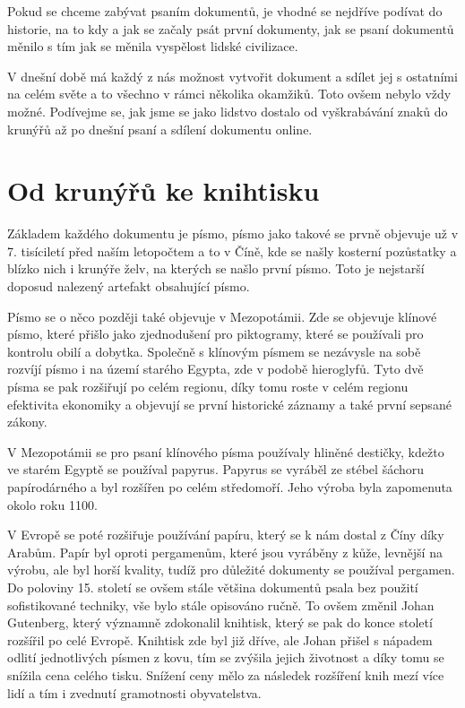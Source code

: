 Pokud se chceme zabývat psaním dokumentů, je vhodné se nejdříve podívat do historie, na to kdy a jak se začaly psát první dokumenty, jak se psaní dokumentů
měnilo s tím jak se měnila vyspělost lidské civilizace.

V dnešní době má každý z nás možnost vytvořit dokument a sdílet jej s ostatními na celém světe a to všechno v rámci několika okamžiků. Toto ovšem nebylo
vždy možné. Podívejme se, jak jsme se jako lidstvo dostalo od vyškrabávání znaků do krunýřů až po dnešní psaní a sdílení dokumentu online.

\section{Od krunýřů ke knihtisku}

Základem každého dokumentu je písmo, písmo jako takové se prvně objevuje už v 7. tisíciletí před naším letopočtem a to v Číně,
kde se našly kosterní pozůstatky a blízko nich i krunýře želv, na kterých se našlo první písmo. \cite{EarliestWriting} Toto je nejstarší doposud
nalezený artefakt obsahující písmo.

Písmo se o něco později také objevuje v Mezopotámii. Zde se objevuje klínové písmo, které přišlo jako zjednodušení pro piktogramy, které se používali
pro kontrolu obilí a dobytka. Společně s klínovým písmem se nezávysle na sobě rozvíjí písmo i na území starého Egypta, zde v podobě hieroglyfů. Tyto dvě
písma se pak rozšiřují po celém regionu, díky tomu roste v celém regionu efektivita ekonomiky a objevují se první historické záznamy
\cite{MesopotamiaHistory} a také první sepsané zákony.

V Mezopotámii se pro psaní klínového písma používaly hliněné destičky, kdežto ve starém Egyptě se používal papyrus. Papyrus se vyráběl ze stébel šáchoru
papírodárného a byl rozšířen po celém středomoří. Jeho výroba byla zapomenuta okolo roku 1100.

V Evropě se poté rozšiřuje používání papíru, který se k nám dostal z Číny díky Arabům. Papír byl oproti pergamenům, které jsou vyráběny z kůže, levnější
na výrobu, ale byl horší kvality, tudíž pro důležité dokumenty se používal pergamen. Do poloviny 15. století se ovšem stále většina dokumentů psala bez
použití sofistikované techniky, vše bylo stále opisováno ručně. To ovšem změnil Johan Gutenberg, který významně zdokonalil knihtisk, který se pak do
konce století rozšířil po celé Evropě. Knihtisk zde byl již dříve, ale Johan přišel s nápadem odlití jednotlivých písmen z kovu, tím se zvýšila
jejich životnost a díky tomu se snížila cena celého tisku. Snížení ceny mělo za následek rozšíření knih mezí více lidí a tím i zvednutí gramotnosti
obyvatelstva. \cite{ucebnice1}

